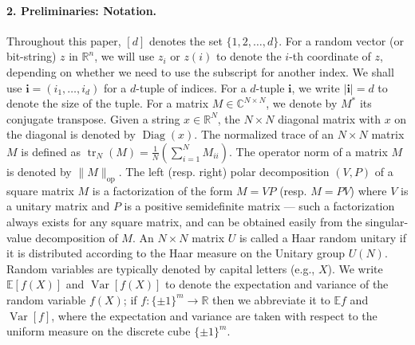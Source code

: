 \paragraph{2. Preliminaries: Notation.}
Throughout this paper, $[d]$ denotes the set $\{1,2,\ldots,d\}$. For a random vector (or bit-string) $z$ in $\mathbb R^n$, we will use $z_i$ or $z(i)$ to denote the $i$-th coordinate of $z$, depending on whether we need to use the subscript for another index. We shall use $\mathbf i=(i_1,\ldots,i_d)$ for a $d$-tuple of indices. For a $d$-tuple $\mathbf i$, we write $|\mathbf i|=d$ to denote the size of the tuple.
For a matrix $M\in\mathbb C^{N\times N}$, we denote by $M^*$ its conjugate transpose. Given a string $x\in\mathbb R^N$, the $N\times N$ diagonal matrix with $x$ on the diagonal is denoted by $\operatorname{Diag}(x)$. The normalized trace of an $N\times N$ matrix $M$ is defined as $\operatorname{tr}_N(M)=\frac1N(\sum_{i=1}^NM_{ii})$. The operator norm of a matrix $M$ is denoted by $\|M\|_{\mathrm{op}}$. The left (resp. right) polar decomposition $(V,P)$ of a square matrix $M$ is a factorization of the form $M=VP$ (resp. $M=PV$) where $V$ is a unitary matrix and $P$ is a positive semidefinite matrix --- such a factorization always exists for any square matrix, and can be obtained easily from the singular-value decomposition of $M$. An $N\times N$ matrix $U$ is called a Haar random unitary if it is distributed according to the Haar measure on the Unitary group $U(N)$.
Random variables are typically denoted by capital letters (e.g., $X$). We write $\mathbb E[f(X)]$ and $\operatorname{Var}[f(X)]$ to denote the expectation and variance of the random variable $f(X)$; if $f:\{\pm1\}^m\to\mathbb R$ then we abbreviate it to $\mathbb Ef$ and $\operatorname{Var}[f]$, where the expectation and variance are taken with respect to the uniform measure on the discrete cube $\{\pm1\}^m$.
